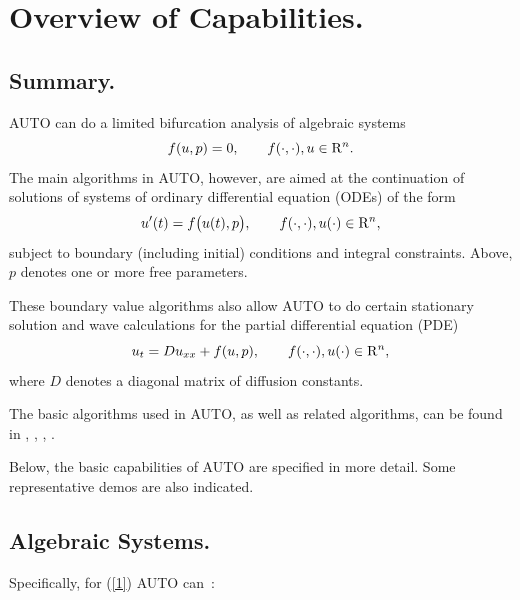\documentclass[12pt]{report}
\def\Rn{{\rm R}^n}
\begin{document}
\chapter{ Overview of Capabilities.} \label{ch:Overview}
\section{ Summary.} \label{sec:Summary}
{\cal AUTO} can do a limited bifurcation analysis of algebraic systems
\begin{equation} \label{1} 
  f( u , p ) = 0 ,  \qquad  f(\cdot,\cdot) , u \in \Rn.
\end{equation}
The main algorithms in {\cal AUTO}, however, are aimed at the continuation
of solutions of systems of ordinary differential equation (ODEs) of the form
\begin{equation} \label{2} 
 u'(t) = f\bigl( u(t) , p \bigr) , 
  \qquad  f(\cdot,\cdot) , u(\cdot) \in \Rn,
\end{equation}
subject to boundary (including initial) conditions and integral constraints.
Above, $p$ denotes one or more free parameters.

These boundary value algorithms also allow {\cal AUTO} to do certain stationary 
solution and wave calculations for the partial differential equation (PDE)
\begin{equation} \label{3} 
  u_t = D u_{xx} + f( u , p ), 
  \qquad  f(\cdot,\cdot) , u(\cdot) \in \Rn,
\end{equation}
where $D$ denotes a diagonal matrix of diffusion constants.

The basic algorithms used in {\cal AUTO},
as well as related algorithms, can be found in 
 \citeyear{HBK:77},
 \citeyear{HBK:86},
 \citeyear{DoKeKe:91a},
 \citeyear{DoKeKe:91b}.

Below, the basic capabilities of {\cal AUTO} are specified in more detail.
Some representative demos are also indicated.
 
\section{ Algebraic Systems.} \label{sec:algebraic_systems}
Specifically, for (\ref{1}) {\cal AUTO} can~:~
 
\end{document}
